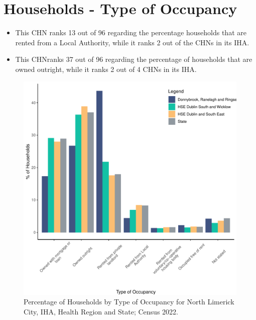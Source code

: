 \documentclass{article}
\begin{document}
\section{Households - Type of Occupancy}\label{sect:Households}
\begin{itemize}
\item This CHN ranks  13 out of 96 regarding the percentage households that are rented from a Local Authority, while it ranks  2 out of the CHNs in its IHA. 
\item This CHNranks  37 out of 96 regarding the percentage of households that are owned outright, while it ranks   2 out of 4 CHNs in its IHA.
\end{itemize}
\begin{figure}[H]
	\centering
	\includegraphics[width = 140mm]{../figures/HouseholdsED.pdf}
	\caption{Percentage of Households by Type of Occupancy for North Limerick City, IHA, Health Region and State; Census 2022.}
	\label{fig:vbnv}
	\end{figure}
\end{document}

